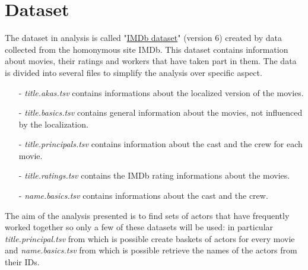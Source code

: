 \documentclass[14pt]{extarticle}
\begin{document}
\section{Dataset}
The dataset in analysis is called "\href{https://www.kaggle.com/ashirwadsangwan/imdb-dataset}{IMDb dataset}" (version 6) created by data collected from the homonymous site IMDb. This dataset contains information about movies, their ratings and workers that have taken part in them. The data is divided into several files to simplify the analysis over specific aspect.
\begin{itemize}[leftmargin=*]
\vspace{-0.4cm}\item[-]{\it title.akas.tsv} contains informations about the localized version of the movies.
\vspace{-0.4cm}\item[-]{\it title.basics.tsv} contains general information about the movies, not influenced by the localization.
\vspace{-0.4cm}\item[-]{\it title.principals.tsv} contains information about the cast and the crew for each movie.
\vspace{-0.4cm}\item[-]{\it title.ratings.tsv} contains the IMDb rating informations about the movies.
\vspace{-1.0cm}\item[-]{\it name.basics.tsv} contains informations about the cast and the crew.
\end{itemize}
The aim of the analysis presented is to find sets of actors that have frequently worked together so only a few of these datasets will be used: in particular {\it title.principal.tsv} from which is possible create baskets of actors for every movie and {\it name.basics.tsv} from which is possible retrieve the names of the actors from their IDs.
\end{document}
